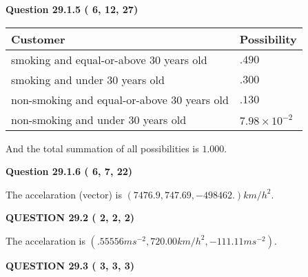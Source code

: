 \documentclass[12pt]{article}
\begin{document}
{\textbf{\Large{Question
29.1.5 
 (          6,         12,         27)
}}}
  
  
 
 
\noindent{}

 
\noindent
\begin{tabular}{|l|l|}
\hline
Customer & Possibility \\
\hline
smoking  and  %
equal-or-above 30 years old &
  $ %
.490$ \\
\hline
smoking  and  %
under 30 years old &
  $ %
.300$ \\
\hline
 non-smoking and  %
equal-or-above 30 years old &
  $ %
.130$ \\
\hline
 non-smoking and  %
under 30 years old &
  $ %
7.98 \times 10^{-2}$ \\
\hline
\end{tabular}
 
\noindent
 And the total summation of all possibilities is $  %
1.000 $.
 
 
 
  
\vspace{0.2in}
  
{\textbf{\Large{Question
29.1.6 
 (          6,          7,         22)
}}}
  
  
 
 
\noindent{}
 
 
The accelaration (vector) is
$(
7476.9,
747.69 ,
-498462.
)km/h^2.
$
 
 
 
 
  
\vspace{0.2in}
  
{\textbf{\Large{QUESTION
29.2 
 (          2,          2,          2)
}}}
  
  
 
 
\noindent{}
 
 
The accelaration is
$(
.55556ms^{-2},
720.00km/h^2,
-111.11ms^{-2}
).
$
 
 
 
 
  
\vspace{0.2in}
  
{\textbf{\Large{QUESTION
29.3 
 (          3,          3,          3)
}}}
  
\end{document}
